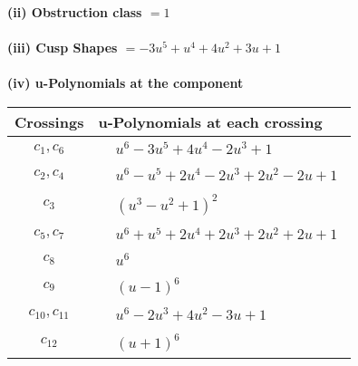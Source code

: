 \documentclass[1p]{elsarticle_modified}
\theoremstyle{definition}
\begin{document}
\flushleft \textbf{(ii) Obstruction class $= 1$}\\~\\
\flushleft \textbf{(iii) Cusp Shapes $= -3 u^5+u^4+4 u^2+3 u+1$}\\~\\
\newpage\renewcommand{\arraystretch}{1}
\flushleft \textbf{(iv) u-Polynomials at the component}\newline \\
\begin{tabular}{m{50pt}|m{274pt}}
Crossings & \hspace{64pt}u-Polynomials at each crossing \\
\hline $$\begin{aligned}c_{1},c_{6}\end{aligned}$$&$\begin{aligned}
&u^6-3 u^5+4 u^4-2 u^3+1
\end{aligned}$\\
\hline $$\begin{aligned}c_{2},c_{4}\end{aligned}$$&$\begin{aligned}
&u^6- u^5+2 u^4-2 u^3+2 u^2-2 u+1
\end{aligned}$\\
\hline $$\begin{aligned}c_{3}\end{aligned}$$&$\begin{aligned}
&(u^3- u^2+1)^2
\end{aligned}$\\
\hline $$\begin{aligned}c_{5},c_{7}\end{aligned}$$&$\begin{aligned}
&u^6+u^5+2 u^4+2 u^3+2 u^2+2 u+1
\end{aligned}$\\
\hline $$\begin{aligned}c_{8}\end{aligned}$$&$\begin{aligned}
&u^6
\end{aligned}$\\
\hline $$\begin{aligned}c_{9}\end{aligned}$$&$\begin{aligned}
&(u-1)^6
\end{aligned}$\\
\hline $$\begin{aligned}c_{10},c_{11}\end{aligned}$$&$\begin{aligned}
&u^6-2 u^3+4 u^2-3 u+1
\end{aligned}$\\
\hline $$\begin{aligned}c_{12}\end{aligned}$$&$\begin{aligned}
&(u+1)^6
\end{aligned}$\\
\hline
\end{tabular}\\~\\
\end{document}
